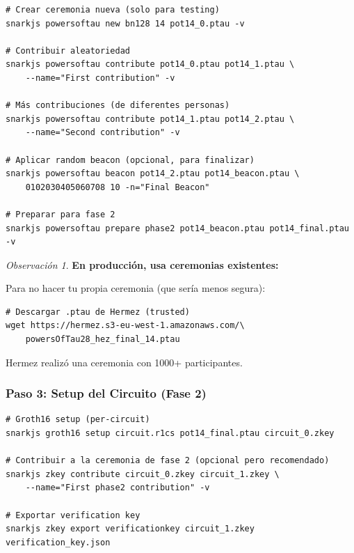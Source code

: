 \documentclass[11pt,a4paper,twoside,openright]{book}
\theoremstyle{definition}
\theoremstyle{plain}
\theoremstyle{remark}
\newtheorem{remark}{Observación}[chapter]
\begin{document}
\begin{verbatim}
# Crear ceremonia nueva (solo para testing)
snarkjs powersoftau new bn128 14 pot14_0.ptau -v

# Contribuir aleatoriedad
snarkjs powersoftau contribute pot14_0.ptau pot14_1.ptau \
    --name="First contribution" -v

# Más contribuciones (de diferentes personas)
snarkjs powersoftau contribute pot14_1.ptau pot14_2.ptau \
    --name="Second contribution" -v

# Aplicar random beacon (opcional, para finalizar)
snarkjs powersoftau beacon pot14_2.ptau pot14_beacon.ptau \
    0102030405060708 10 -n="Final Beacon"

# Preparar para fase 2
snarkjs powersoftau prepare phase2 pot14_beacon.ptau pot14_final.ptau -v
\end{verbatim}

\begin{remark}
\textbf{En producción, usa ceremonias existentes:}

Para no hacer tu propia ceremonia (que sería menos segura):

\begin{verbatim}
# Descargar .ptau de Hermez (trusted)
wget https://hermez.s3-eu-west-1.amazonaws.com/\
    powersOfTau28_hez_final_14.ptau
\end{verbatim}

Hermez realizó una ceremonia con 1000+ participantes.
\end{remark}

\subsubsection{Paso 3: Setup del Circuito (Fase 2)}

\begin{verbatim}
# Groth16 setup (per-circuit)
snarkjs groth16 setup circuit.r1cs pot14_final.ptau circuit_0.zkey

# Contribuir a la ceremonia de fase 2 (opcional pero recomendado)
snarkjs zkey contribute circuit_0.zkey circuit_1.zkey \
    --name="First phase2 contribution" -v

# Exportar verification key
snarkjs zkey export verificationkey circuit_1.zkey verification_key.json
\end{verbatim}
\end{document}
